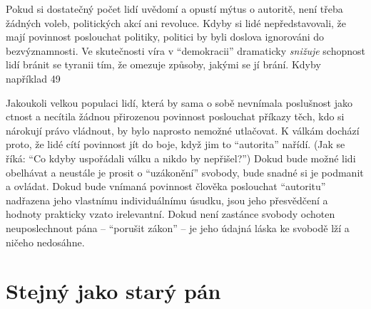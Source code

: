 \documentclass{book}
\begin{document}
Pokud si dostatečný počet lidí uvědomí a opustí mýtus o autoritě, není třeba žádných voleb, politických akcí ani revoluce. Kdyby si lidé nepředstavovali, že mají povinnost poslouchat politiky, politici by byli doslova ignorováni do bezvýznamnosti. Ve skutečnosti víra v \enquote{demokracii} dramaticky \emph{snižuje} schopnost lidí bránit se tyranii tím, že omezuje způsoby, jakými se jí brání. Kdyby například 49 %

Jakoukoli velkou populaci lidí, která by sama o sobě nevnímala poslušnost jako ctnost a necítila žádnou přirozenou povinnost poslouchat příkazy těch, kdo si nárokují právo vládnout, by bylo naprosto nemožné utlačovat. K válkám dochází proto, že lidé cítí povinnost jít do boje, když jim to \enquote{autorita} nařídí. (Jak se říká: \enquote{Co kdyby uspořádali válku a nikdo by nepřišel?}) Dokud bude možné lidi obelhávat a neustále je prosit o \enquote{uzákonění} svobody, bude snadné si je podmanit a ovládat. Dokud bude vnímaná povinnost člověka poslouchat \enquote{autoritu} nadřazena jeho vlastnímu individuálnímu úsudku, jsou jeho přesvědčení a hodnoty prakticky vzato irelevantní. Dokud není zastánce svobody ochoten neuposlechnout pána -- \enquote{porušit zákon} -- je jeho údajná láska ke svobodě lží a ničeho nedosáhne.

\section{Stejný jako starý pán}
\end{document}
